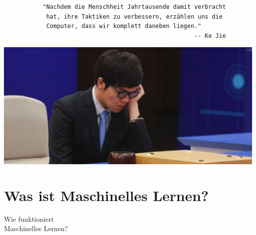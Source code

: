 \documentclass[aspectratio=169,x11names]{beamer}
\begin{document}
\begin{frame}[fragile]
\small
\begin{verbatim}
           "Nachdem die Menschheit Jahrtausende damit verbracht
            hat, ihre Taktiken zu verbessern, erzählen uns die
            Computer, dass wir komplett daneben liegen."
                                                      -- Ke Jie
\end{verbatim}

\begin{center}
\includegraphics[scale=0.65]{images/kejie.png} 
\end{center}
\end{frame}


\section{Was ist Maschinelles Lernen?}

\begin{frame}
\begin{center}
\huge
Wie funktioniert\\Maschinelles Lernen?
\end{center}
\end{frame}
\end{document}
